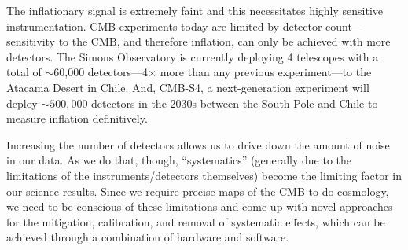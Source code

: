 The inflationary signal is extremely faint and this necessitates highly sensitive instrumentation. CMB experiments today are limited by detector count---sensitivity to the CMB, and therefore inflation, can only be achieved with more detectors. The Simons Observatory is currently deploying 4 telescopes with a total of $\sim$60,000 detectors---4$\times$ more than any previous experiment---to the Atacama Desert in Chile. And, CMB-S4, a next-generation experiment will deploy $\sim500,000$ detectors in the 2030s between the South Pole and Chile to measure inflation definitively. 

Increasing the number of detectors allows us to drive down the amount of noise in our data. As we do that, though, ``systematics'' (generally due to the limitations of the instruments/detectors themselves) become the limiting factor in our science results. Since we require precise maps of the CMB to do cosmology, we need to be conscious of these limitations and come up with novel approaches for the mitigation, calibration, and removal of systematic effects, which can be achieved through a combination of hardware and software.


